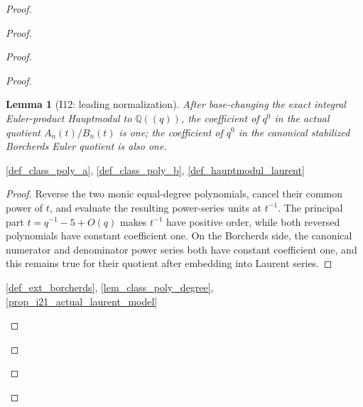 \documentclass[11pt,a4paper]{article}
\numberwithin{equation}{section}
\theoremstyle{plain}\newtheorem{theorem}{Theorem}[section]\newaliascnt{proposition}{theorem}\newtheorem{proposition}[proposition]{Proposition}\aliascntresetthe{proposition}\newaliascnt{lemma}{theorem}\newtheorem{lemma}[lemma]{Lemma}\aliascntresetthe{lemma}
\theoremstyle{definition}\newaliascnt{definition}{theorem}\newtheorem{definition}[definition]{Definition}\aliascntresetthe{definition}\newaliascnt{notation}{theorem}\newtheorem{notation}[notation]{Notation}\aliascntresetthe{notation}
\providecommand{\lean}[1]{}\providecommand{\leanok}{}
\begin{document}
\begin{proof}
\begin{proof}
\begin{proof}
\begin{proof}
\begin{lemma}[I12: leading normalization]\label{lem_i12_leading_normalization}\lean{SptCM.Analytic.Repaired.i12_leading_normalization}\leanok
After base-changing the exact integral Euler-product Hauptmodul to $\mathbb Q((q))$, the coefficient of $q^0$ in the actual quotient $A_n(t)/B_n(t)$ is one; the coefficient of $q^0$ in the canonical stabilized Borcherds Euler quotient is also one.
\end{lemma}
\begin{uses-statement}\ref{def_class_poly_a}, \ref{def_class_poly_b}, \ref{def_hauptmodul_laurent}\end{uses-statement}
\begin{proof}Reverse the two monic equal-degree polynomials, cancel their common power of $t$, and evaluate the resulting power-series units at $t^{-1}$.  The principal part $t=q^{-1}-5+O(q)$ makes $t^{-1}$ have positive order, while both reversed polynomials have constant coefficient one.  On the Borcherds side, the canonical numerator and denominator power series both have constant coefficient one, and this remains true for their quotient after embedding into Laurent series.\end{proof}
\begin{uses-proof}\ref{def_ext_borcherds}, \ref{lem_class_poly_degree}, \ref{prop_i21_actual_laurent_model}\end{uses-proof}


\end{proof}
\end{proof}
\end{proof}
\end{proof}
\end{document}
